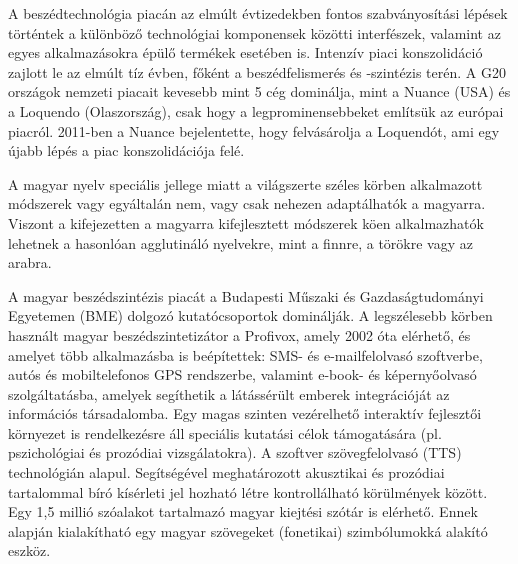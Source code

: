 \begin{multicols}{2}
A beszédtechnológia piacán az elmúlt évtizedekben fontos szabványosítási lépések történtek a különböző technológiai komponensek közötti interfészek, valamint az egyes alkalmazásokra épülő termékek ese\-té\-ben is. Intenzív piaci konszolidáció zajlott le az elmúlt tíz évben, főként a beszédfelismerés és -szintézis terén. A G20 országok nemzeti piacait kevesebb mint 5 cég dominálja, mint a Nuance (USA) és a Loquendo (Olaszország), csak hogy a legprominensebbeket említsük az európai piacról. 2011-ben a Nuance bejelentette, hogy felvásárolja a Loquendót, ami egy újabb lépés a piac konszolidációja felé. 

\columnbreak
A magyar nyelv speciális jellege miatt a világszerte széles körben alkalmazott módszerek vagy egyáltalán nem, vagy csak nehezen adaptálhatók a magyarra. Vi\-szont a kifejezetten a magyarra ki\-fej\-lesz\-tett módszerek köen alkalmazhatók lehetnek a hasonlóan agglutináló nyel\-vek\-re, mint a finnre, a törökre vagy az arabra. 

A magyar beszédszintézis piacát a Budapesti Műszaki és Gazdaságtudományi Egyetemen (BME) dolgozó kutatócsoportok \cite{bme} dominálják. A legszélesebb körben használt magyar beszédszintetizátor a Profivox, amely 2002 óta elérhető, és amelyet több alkalmazásba is beépítettek: SMS- és e-mailfelolvasó szoftverbe, autós és mobiltelefonos GPS rendszerbe, valamint e-book- és képernyőolvasó szolgáltatásba, amelyek segíthetik a látássérült emberek integrációját az információs társadalomba. Egy magas szinten vezérelhető interaktív fejlesztői környezet is rendelkezésre áll speciális kutatási célok támogatására (pl. pszichológiai és prozódiai vizsgálatokra). A szoftver szövegfelolvasó (TTS) technológián alapul. Segítségével meghatározott akusztikai és prozódiai tartalommal bíró kísérleti jel hozható létre kont\-rol\-lál\-ha\-tó körülmények között. Egy 1,5 millió szóalakot tartalmazó magyar kiejtési szótár is elérhető. Ennek alapján ki\-ala\-kít\-ha\-tó egy magyar szövegeket (fonetikai) szimbólumokká alakító eszköz. 


\end{multicols}
